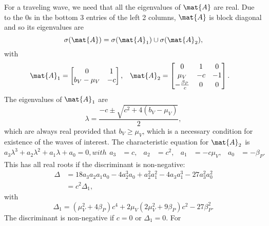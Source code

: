 \documentclass{jpmarticle}
\begin{document}
For a traveling wave, we need that all the eigenvalues of $\mat{A}$
are real.  Due to the $0$s in the bottom 3 entries of the left 2
columns, $\mat{A}$ is block diagonal and so its eigenvalues are
\begin{equation}
  \sigma(\mat{A}) = \sigma(\mat{A}_1) \cup \sigma(\mat{A}_2),
\end{equation}
with
\begin{align}
  \mat{A}_1 &=
  \begin{bmatrix}
    0 & 1 \\
    b_V - \mu_V & - c
  \end{bmatrix},
  &
  \mat{A}_2 &=
  \begin{bmatrix}
    0 & 1 & 0 \\
    \mu_V & - c & - 1 \\
    - \frac{\beta_P}{c} & 0 & 0
  \end{bmatrix}.
\end{align}
The eigenvalues of $\mat{A}_1$ are
\begin{equation}
  \lambda = \frac{-c \pm \sqrt{c^2 + 4 (b_V - \mu_V)}}{2},
\end{equation}
which are always real provided that $b_V \geq \mu_V$, which is a
necessary condition for existence of the waves of interest.  The
characteristic equation for $\mat{A}_2$ is
\begin{subequations}
  \begin{equation}
    a_3 \lambda^3 + a_2 \lambda^2 +
    a_1 \lambda + a_0 = 0,
  \end{equation}
  with
  \begin{align}
    a_3 &= c, &
    a_2 &= c^2, &
    a_1 &= - c \mu_V, &
    a_0 &= - \beta_P.
  \end{align}
\end{subequations}
This has all real roots if the discriminant is non-negative:
\begin{equation}
  \begin{split}
    \Delta &=
    18 a_3 a_2 a_1 a_0
    - 4 a_2^3 a_0
    + a_2^2 a_1^2
    - 4 a_3 a_1^3
    - 27 a_3^2 a_0^2
    \\
    &= c^2 \Delta_1,
  \end{split}
\end{equation}
with
\begin{equation}
  \Delta_1
  =
  \left(\mu_V^2 + 4 \beta_P\right) c^4
  + 2 \mu_V \left(2 \mu_V^2 + 9 \beta_P\right) c^2
  - 27 \beta_P^2.
\end{equation}
The discriminant is non-negative if $c = 0$ or $\Delta_1 = 0$.  For
\end{document}
